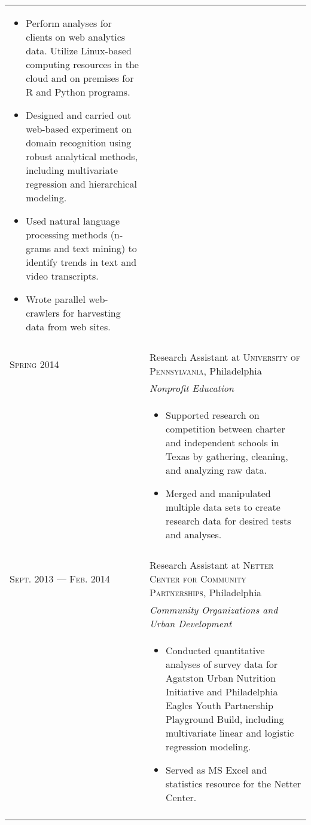 \documentclass[a4paper,10pt]{article}
\begin{document}
\begin{longtable}{p{} | p{} |}
{\begin{itemize}
        \item Perform analyses for clients on web analytics data. Utilize Linux-based computing resources in the cloud and on premises for R and Python programs. 
        \item Designed and carried out web-based experiment on domain recognition using robust analytical methods, including multivariate regression and hierarchical modeling.
        \item Used natural language processing methods (n-grams and text mining) to identify trends in text and video transcripts. 
        \item Wrote parallel web-crawlers for harvesting data from web sites.
      \end{itemize}
    }\\ 
  \multicolumn{2}{c}{} \\ 
  \textsc{Spring 2014} & Research Assistant at \textsc{University of Pennsylvania}, Philadelphia \\
    &\emph{Nonprofit Education}\\ 
    &\footnotesize{ 
    \begin{itemize}
      \item Supported research on competition between charter and independent schools in Texas by gathering, cleaning, and analyzing raw data. 
      \item Merged and manipulated multiple data sets to create research data for desired tests and analyses.
      \end{itemize}
    }\\ 
  \multicolumn{2}{c}{} \\ 
  \pagebreak
  \textsc{Sept. 2013 --- Feb. 2014} & Research Assistant at \textsc{Netter Center for Community Partnerships}, Philadelphia \\ 
    &\emph{Community Organizations and Urban Development}\\ 
    &\footnotesize{ 
    \begin{itemize}
      \item Conducted quantitative analyses of survey data for Agatston Urban Nutrition Initiative and Philadelphia Eagles Youth Partnership Playground Build, including multivariate linear and logistic regression modeling. 
      \item Served as MS Excel and statistics resource for the Netter Center. 
      \end{itemize}
    }\\ 
  \multicolumn{2}{c}{} \\ 

\end{longtable}
\end{document}
